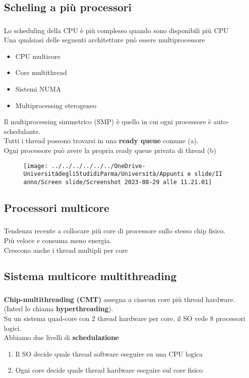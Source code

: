 \documentclass{beamer}
\newenvironment{mainframe}{
	\begin{frame}
		\frametitle{\insertsubsection}
		\framesubtitle{\insertsection}
	}{
	\end{frame}
}
\begin{document}
\subsection{Scheling a più processori}
\begin{mainframe}
	Lo scheduling della CPU è più complesso quando sono disponibili più CPU\\
	Una qualsiasi delle seguenti architetture può essere multiprocessore
	\begin{itemize}
		\item CPU multicore
		\item Core multithread
		\item Sistemi NUMA
		\item Multiprocessing eterogeneo
	\end{itemize}
\end{mainframe}
\begin{frame}
	Il multiprocessing simmetrico (SMP) è quello in cui ogni processore è auto-schedulante.\\
	Tutti i thread possono trovarsi in una \textbf{ready queue} comune (a).\\
	Ogni processore può avere la propria ready queue privata di thread (b)
	\begin{figure}
		\centering
		\texttt{[image: ../../../../../../OneDrive-UniversitàdegliStudidiParma/Università/Appunti e slide/II anno/Screen slide/Screenshot 2023-08-29 alle 11.21.01]}
	\end{figure}
\end{frame}
\subsection{Processori multicore}
\begin{mainframe}
	Tendenza recente a collocare più core di processore sullo stesso chip fisico.\\
	Più veloce e consuma meno energia.\\
	Crescono anche i thread multipli per core
\end{mainframe}
\subsection{Sistema multicore multithreading}
\begin{mainframe}
	\textbf{Chip-multithreading (CMT)} assegna a ciascun core più thread hardware. (Interl lo chiama \textbf{hyperthreading}).\\
	Su un sistema quad-core con 2 thread hardware per core, il SO vede 8 processori logici.\\
	Abbiamo due livelli di \textbf{schedulazione}
	\begin{enumerate}
		\item Il SO decide quale thread software eseguire su una CPU logica
		\item Ogni core decide quale thread hardware eseguire sul core fisico
	\end{enumerate}
\end{mainframe}
\end{document}
